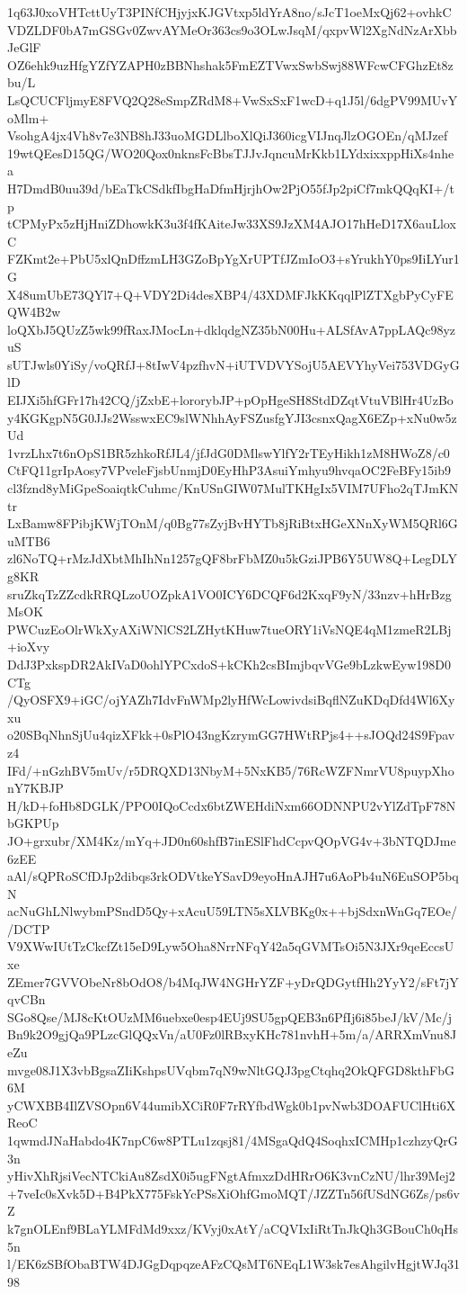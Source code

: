 1q63J0xoVHTcttUyT3PINfCHjyjxKJGVtxp5ldYrA8no/sJcT1oeMxQj62+ovhkC
VDZLDF0bA7mGSGv0ZwvAYMeOr363cs9o3OLwJsqM/qxpvWl2XgNdNzArXbbJeGlF
OZ6ehk9uzHfgYZfYZAPH0zBBNhshak5FmEZTVwxSwbSwj88WFcwCFGhzEt8zbu/L
LsQCUCFljmyE8FVQ2Q28eSmpZRdM8+VwSxSxF1wcD+q1J5l/6dgPV99MUvYoMlm+
VsohgA4jx4Vh8v7e3NB8hJ33uoMGDLlboXlQiJ360icgVIJnqJlzOGOEn/qMJzef
19wtQEesD15QG/WO20Qox0nknsFcBbsTJJvJqncuMrKkb1LYdxixxppHiXs4nhea
H7DmdB0uu39d/bEaTkCSdkfIbgHaDfmHjrjhOw2PjO55fJp2piCf7mkQQqKI+/tp
tCPMyPx5zHjHniZDhowkK3u3f4fKAiteJw33XS9JzXM4AJO17hHeD17X6auLloxC
FZKmt2e+PbU5xlQnDffzmLH3GZoBpYgXrUPTfJZmIoO3+sYrukhY0ps9IiLYur1G
X48umUbE73QYl7+Q+VDY2Di4desXBP4/43XDMFJkKKqqlPlZTXgbPyCyFEQW4B2w
loQXbJ5QUzZ5wk99fRaxJMocLn+dklqdgNZ35bN00Hu+ALSfAvA7ppLAQc98yzuS
sUTJwls0YiSy/voQRfJ+8tIwV4pzfhvN+iUTVDVYSojU5AEVYhyVei753VDGyGlD
EIJXi5hfGFr17h42CQ/jZxbE+lororybJP+pOpHgeSH8StdDZqtVtuVBlHr4UzBo
y4KGKgpN5G0JJs2WsswxEC9slWNhhAyFSZusfgYJI3csnxQagX6EZp+xNu0w5zUd
1vrzLhx7t6nOpS1BR5zhkoRfJL4/jfJdG0DMlswYlfY2rTEyHikh1zM8HWoZ8/c0
CtFQ11grIpAosy7VPveleFjsbUnmjD0EyHhP3AsuiYmhyu9hvqaOC2FeBFy15ib9
cl3fznd8yMiGpeSoaiqtkCuhmc/KnUSnGIW07MulTKHgIx5VIM7UFho2qTJmKNtr
LxBamw8FPibjKWjTOnM/q0Bg77sZyjBvHYTb8jRiBtxHGeXNnXyWM5QRl6GuMTB6
zl6NoTQ+rMzJdXbtMhIhNn1257gQF8brFbMZ0u5kGziJPB6Y5UW8Q+LegDLYg8KR
sruZkqTzZZcdkRRQLzoUOZpkA1VO0ICY6DCQF6d2KxqF9yN/33nzv+hHrBzgMsOK
PWCuzEoOlrWkXyAXiWNlCS2LZHytKHuw7tueORY1iVsNQE4qM1zmeR2LBj+ioXvy
DdJ3PxkspDR2AkIVaD0ohlYPCxdoS+kCKh2csBImjbqvVGe9bLzkwEyw198D0CTg
/QyOSFX9+iGC/ojYAZh7IdvFnWMp2lyHfWcLowivdsiBqflNZuKDqDfd4Wl6Xyxu
o20SBqNhnSjUu4qizXFkk+0sPlO43ngKzrymGG7HWtRPjs4++sJOQd24S9Fpavz4
IFd/+nGzhBV5mUv/r5DRQXD13NbyM+5NxKB5/76RcWZFNmrVU8puypXhonY7KBJP
H/kD+foHb8DGLK/PPO0IQoCcdx6btZWEHdiNxm66ODNNPU2vYlZdTpF78NbGKPUp
JO+grxubr/XM4Kz/mYq+JD0n60shfB7inESlFhdCcpvQOpVG4v+3bNTQDJme6zEE
aAl/sQPRoSCfDJp2dibqs3rkODVtkeYSavD9eyoHnAJH7u6AoPb4uN6EuSOP5bqN
acNuGhLNlwybmPSndD5Qy+xAcuU59LTN5sXLVBKg0x++bjSdxnWnGq7EOe//DCTP
V9XWwIUtTzCkcfZt15eD9Lyw5Oha8NrrNFqY42a5qGVMTsOi5N3JXr9qeEccsUxe
ZEmer7GVVObeNr8bOdO8/b4MqJW4NGHrYZF+yDrQDGytfHh2YyY2/sFt7jYqvCBn
SGo8Qse/MJ8cKtOUzMM6uebxe0esp4EUj9SU5gpQEB3n6PfIj6i85beJ/kV/Mc/j
Bn9k2O9gjQa9PLzcGlQQxVn/aU0Fz0lRBxyKHc781nvhH+5m/a/ARRXmVnu8JeZu
mvge08J1X3vbBgsaZIiKshpsUVqbm7qN9wNltGQJ3pgCtqhq2OkQFGD8kthFbG6M
yCWXBB4IlZVSOpn6V44umibXCiR0F7rRYfbdWgk0b1pvNwb3DOAFUClHti6XReoC
1qwmdJNaHabdo4K7npC6w8PTLu1zqsj81/4MSgaQdQ4SoqhxICMHp1czhzyQrG3n
yHivXhRjsiVecNTCkiAu8ZsdX0i5ugFNgtAfmxzDdHRrO6K3vnCzNU/lhr39Mej2
+7veIc0sXvk5D+B4PkX775FskYcPSsXiOhfGmoMQT/JZZTn56fUSdNG6Zs/ps6vZ
k7gnOLEnf9BLaYLMFdMd9xxz/KVyj0xAtY/aCQVIxIiRtTnJkQh3GBouCh0qHs5n
l/EK6zSBfObaBTW4DJGgDqpqzeAFzCQsMT6NEqL1W3sk7esAhgilvHgjtWJq3198
